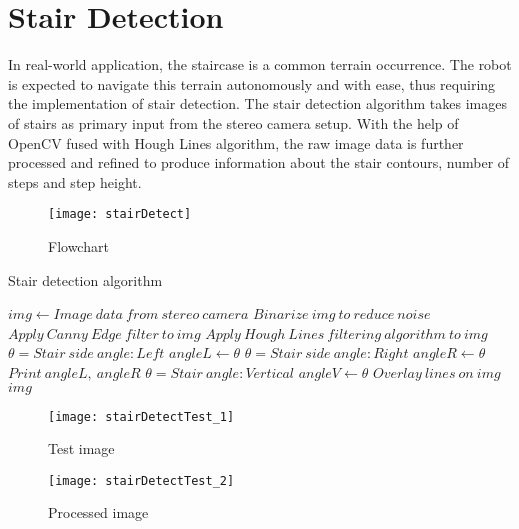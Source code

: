 \section{Stair Detection}

In real-world application, the staircase is a common terrain occurrence. The robot is expected to navigate this terrain autonomously and with ease, thus requiring the implementation of stair detection. The stair detection algorithm takes images of stairs as primary input from the stereo camera setup. With the help of OpenCV fused with Hough Lines algorithm, the raw image data is further processed and refined to produce information about the stair contours, number of steps and step height.\\

\begin{figure}[H]
    \centering
    \texttt{[image: stairDetect]}
    \caption{Flowchart}
    \label{fig:stairDetectionFlowchart}
\end{figure}

\begin{algorithm}[hbt!]
    \caption{Stair detection algorithm}\label{alg:cap}
    
    \begin{algorithmic}[1]
    
        \Require $img \gets Image\ data\ from\ stereo\ camera$
        \State $Binarize\ img\ to\ reduce\ noise$
        \State $Apply\ Canny\ Edge\ filter\ to\ img$
        \State $Apply\ Hough\ Lines\ filtering\ algorithm\ to\ img$
            \State $\theta =Stair\ side\ angle:Left$
            \State $angleL \gets \theta$
            \State $\theta = Stair\ side\ angle:Right$
            \State $angleR \gets \theta$
        \EndIf
        \State $Print\ angleL,\ angleR$
            \State $\theta =Stair\ angle: Vertical $
            \State $angleV \gets \theta$
        \EndIf
        \State $Overlay\ lines\ on\ img$
        \\
        \Return $img$
        
    \end{algorithmic}
\end{algorithm}

\newpage

\begin{figure}[H]
  \centering
    \begin{multicols}{2}
        \texttt{[image: stairDetectTest\_1]}
        \caption{Test image}
        \label{fig:testImage}
        
        \texttt{[image: stairDetectTest\_2]}
        \caption{Processed image}
        \label{fig:processedImage}
    \end{multicols}     
\end{figure}


